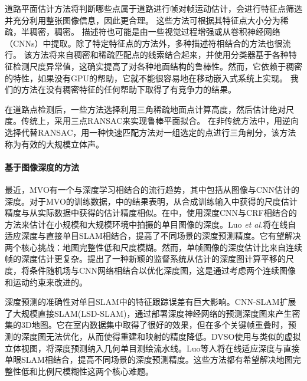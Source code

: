 道路平面估计方法将判断哪些点属于道路进行帧对帧运动估计，会进行特征点筛选并充分利用整张图像信息，因此更合理。 这些方法可根据其特征点大小分为稀疏\cite{engel2017direct}，半稠密\cite{Engel2014LSD}\cite{forster2014svo}，稠密\cite{newcombe2011dtam}。 描述符也可能是由一些视觉过程\cite{chen2012tag}增强或从卷积神经网络（CNNs）中提取\cite{lin2017hnip}\cite{chadha2017voronoi}。除了特定特征点的方法外，多种描述符相结合的方法也很流行。 该方法将来自稠密和稀疏匹配点的线索结合起来，并使用分类器基于各种特征检测尺度异常值，这确实提高了对各种地面结构的鲁棒性。然而，它依赖于稠密的特性，如果没有GPU的帮助，它就不能很容易地在移动嵌入式系统上实现。 我们的方法在没有稠密特征的任何帮助下取得了有竞争力的结果。

在道路点检测后，一些方法\cite{Gall2015}选择利用三角稀疏地面点计算高度，然后估计绝对尺度。传统上，采用三点RANSAC\cite{choi1997performance}来实现鲁棒平面拟合。
在非传统方法中，\cite{pereira2018novel}用逆向选择代替RANSAC，\cite{Geiger2011IV}用一种快速匹配方法对一组选定的点进行三角剖分，该方法称为有效的大规模立体声\cite{geiger2010efficient}。

\paragraph{基于图像深度的方法}
最近，MVO有一个与深度学习相结合的流行趋势，其中包括从图像与CNN估计的深度。对于MVO的训练数据，\cite{rukhovich2019estimation}中的结果表明，从合成训练输入中获得的尺度估计精度与从实际数据中获得的估计精度相似。在\cite{saxena2006learning}中，使用深度CNN与CRF相结合的方法来估计在小规模和大规模环境中拍摄的单目图像的深度。Luo \textit{et al.}将在线自适应深度与直接单目SLAM相结合\cite{luo2018real}，提高了不同场景的深度预测精度。它有望解决两个核心挑战：地图完整性低和尺度模糊。然而，单帧图像的深度估计\cite{karsch2014depth,ranftl2016dense,yang2019bayesian,eigen2014depth,saxena2006learning}比来自连续帧的深度估计更复杂\cite{yang2019bayesian}。\cite{yin2017scale}提出了一种新颖的监督系统从估计的深度图计算平移的尺度，将条件随机场与CNN网络相结合以优化深度图，这是通过考虑两个连续图像和运动约束来改进的。

深度预测的准确性对单目SLAM中的特征跟踪误差有巨大影响。CNN-SLAM\cite{tateno2017cnn}扩展了大规模直接SLAM(LSD-SLAM)\cite{engel2014lsd}，通过部署深度神经网络的预测深度图来产生密集的3D地图。它在室内数据集\cite{Sturm2012A,2014A}中取得了很好的效果，但在多个关键帧重叠时，预测的深度图无法优化，从而使得重建和映射的精度降低。DVSO\cite{yang2018deep}使用与\cite{godard2017unsupervised}类似的虚拟立体视图，将深度预测纳入几何单目测绘流水线。Luo等人\cite{luo2018real}将在线适应深度与直接单眼SLAM相结合，提高不同场景的深度预测精度。这些方法都有希望解决地图完整性低和比例尺模糊性这两个核心难题。

